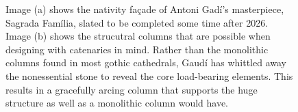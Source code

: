 \documentclass{thesis}
\begin{document}
\begin{figure}
\centering
{}
\caption[Sagrada Fam\'{i}lia, Barcelona, Spain]{Image (a) shows the nativity fa\c{c}ade of Antoni Gad\'{i}'s masterpiece, Sagrada Fam\'{i}lia,
slated to be completed some time after 2026. \cite{img:sagrada_familia_nativity}  Image (b) shows the strucutral columns that are possible when
designing with catenaries in mind.  Rather than the monolithic columns found in most gothic cathedrals, Gaud\'{i} has whittled away the nonessential
stone to reveal the core load-bearing elements.  This results in a gracefully arcing column that supports the huge structure as well as a monolithic
column would have. \cite{img:sagrada_familia_columns}}
\label{fig:sagrada_familia}
\end{figure}
\end{document}
